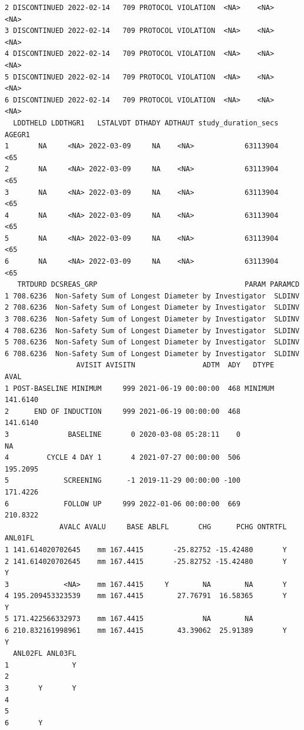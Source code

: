 \documentclass[
  letterpaper,
  DIV=11,
  numbers=noendperiod]{scrreprt}
\begin{document}
\begin{tcolorbox}[enhanced jigsaw, leftrule=.75mm, arc=.35mm, colback=white, colframe=quarto-callout-note-color-frame, opacityback=0, toprule=.15mm, bottomrule=.15mm, rightrule=.15mm, left=2mm, breakable]
\begin{minipage}[t]{\textwidth - 5.5mm}
\begin{verbatim}
2 DISCONTINUED 2022-02-14   709 PROTOCOL VIOLATION  <NA>    <NA>   <NA>
3 DISCONTINUED 2022-02-14   709 PROTOCOL VIOLATION  <NA>    <NA>   <NA>
4 DISCONTINUED 2022-02-14   709 PROTOCOL VIOLATION  <NA>    <NA>   <NA>
5 DISCONTINUED 2022-02-14   709 PROTOCOL VIOLATION  <NA>    <NA>   <NA>
6 DISCONTINUED 2022-02-14   709 PROTOCOL VIOLATION  <NA>    <NA>   <NA>
  LDDTHELD LDDTHGR1   LSTALVDT DTHADY ADTHAUT study_duration_secs AGEGR1
1       NA     <NA> 2022-03-09     NA    <NA>            63113904    <65
2       NA     <NA> 2022-03-09     NA    <NA>            63113904    <65
3       NA     <NA> 2022-03-09     NA    <NA>            63113904    <65
4       NA     <NA> 2022-03-09     NA    <NA>            63113904    <65
5       NA     <NA> 2022-03-09     NA    <NA>            63113904    <65
6       NA     <NA> 2022-03-09     NA    <NA>            63113904    <65
   TRTDURD DCSREAS_GRP                                   PARAM PARAMCD
1 708.6236  Non-Safety Sum of Longest Diameter by Investigator  SLDINV
2 708.6236  Non-Safety Sum of Longest Diameter by Investigator  SLDINV
3 708.6236  Non-Safety Sum of Longest Diameter by Investigator  SLDINV
4 708.6236  Non-Safety Sum of Longest Diameter by Investigator  SLDINV
5 708.6236  Non-Safety Sum of Longest Diameter by Investigator  SLDINV
6 708.6236  Non-Safety Sum of Longest Diameter by Investigator  SLDINV
                 AVISIT AVISITN                ADTM  ADY   DTYPE     AVAL
1 POST-BASELINE MINIMUM     999 2021-06-19 00:00:00  468 MINIMUM 141.6140
2      END OF INDUCTION     999 2021-06-19 00:00:00  468         141.6140
3              BASELINE       0 2020-03-08 05:28:11    0               NA
4         CYCLE 4 DAY 1       4 2021-07-27 00:00:00  506         195.2095
5             SCREENING      -1 2019-11-29 00:00:00 -100         171.4226
6             FOLLOW UP     999 2022-01-06 00:00:00  669         210.8322
             AVALC AVALU     BASE ABLFL       CHG      PCHG ONTRTFL ANL01FL
1 141.614020702645    mm 167.4415       -25.82752 -15.42480       Y        
2 141.614020702645    mm 167.4415       -25.82752 -15.42480       Y       Y
3             <NA>    mm 167.4415     Y        NA        NA       Y        
4 195.209453323539    mm 167.4415        27.76791  16.58365       Y       Y
5 171.422566332973    mm 167.4415              NA        NA                
6 210.832161998961    mm 167.4415        43.39062  25.91389       Y       Y
  ANL02FL ANL03FL
1               Y
2                
3       Y       Y
4                
5                
6       Y        


\end{verbatim}
\end{minipage}
\end{tcolorbox}
\end{document}
